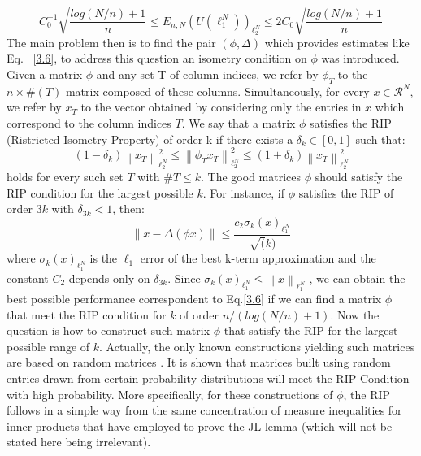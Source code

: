 \begin{equation}
\label{3.6}
    C_0^{-1}\sqrt{\frac{log(N/n)+1}{n}}\leq E_{n,N}(U(\ell_1^N))_{\ell_2^N}\leq 2C_0\sqrt{\frac{log(N/n)+1}{n}}
\end{equation}
The main problem then is to find the pair $(\phi, \Delta)$ which provides estimates like Eq.~ \ref{3.6}, to address this question an isometry condition on $\phi$ was introduced. Given a matrix $\phi$ and any set T of column indices, we refer by $\phi_T$ to the $n\times \#(T)$ matrix composed of these columns. Simultaneously, for every $x\in \mathcal{R}^N$, we refer by $x_T$ to the vector obtained by considering only the entries in $x$ which correspond to the column indices $T$. We say that a matrix $\phi$ satisfies the RIP (Ristricted Isometry Property) of order k if there exists a $\delta_k\in [0,1]$ such that:
\begin{equation}
    \label{3.8}
    (1-\delta_k)\left\|x_T\right\|_{\ell_2^N}^2\leq
    \left\|\phi_Tx_T\right\|_{\ell_2^N}^2\leq  (1+\delta_k)\left\|x_T\right\|_{\ell_2^N}^2
\end{equation}
holds for every such set $T$ with $\#T\leq k$. The good matrices $\phi$ should satisfy the RIP condition for the largest possible $k$. For instance, if $\phi$ satisfies the RIP of order $3k$ with $\delta_{3k}<1$, then:
\begin{equation}
\label{3.9}
\left\|x-\Delta(\phi x)\right\|\leq \frac{c_2\sigma_k(x)_{\ell_1^N}}{\sqrt(k)}
\end{equation}
where $\sigma_k(x)_{\ell_1^N}$ is the $\ell_1$ error of the best k-term approximation and the constant $C_2$ depends only on $\delta_{3k}$. Since $\sigma_k(x)_{\ell_1^N}\leq \left\|x\right\|_{\ell_1^N}$ , we can obtain the best possible performance correspondent to Eq.\ref{3.6} if we can find a matrix $\phi$ that meet the RIP condition for $k$ of order $n/(log(N/n)+1)$.\newline
Now the question is how to construct such matrix $\phi$ that satisfy the RIP for the largest possible range of $k$. Actually, the only known constructions yielding such matrices are based on random matrices \citep{concentration_kashin}. It is shown that matrices built using random entries drawn from certain probability distributions will meet the RIP Condition with high probability. More specifically, for these constructions of $\phi$, the RIP follows in a simple way from the same concentration of measure inequalities for inner products that have employed to prove the JL lemma (which will not be stated here being irrelevant). \newline
